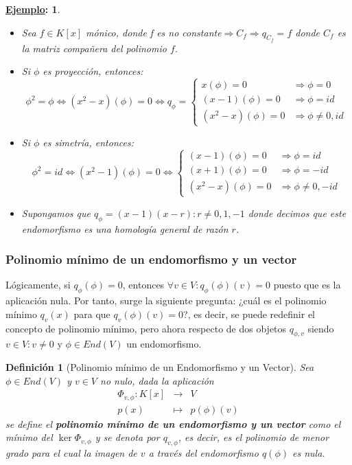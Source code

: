 \documentclass[10pt,a4paper,openright]{book}
\theoremstyle{break}
\newtheorem*{defi}{Definición}
\newtheorem*{ej}{\underline{Ejemplo}:}
\begin{document}
\begin{ej}
\begin{itemize}
\item Sea $f\in K[x]$ mónico, donde f es no constante$\Rightarrow C_f\Rightarrow q_{C_f}=f$ donde $C_f$ es la matriz compañera del polinomio $f$.

\item Si $\phi$ es proyección, entonces:
$$\phi^2= \phi\Leftrightarrow (x^2-x)(\phi)= 0\Leftrightarrow q_\phi = \begin{cases} x(\phi) = 0 & \Rightarrow \phi = 0 \\ (x-1)(\phi) = 0 & \Rightarrow\phi = id \\ (x^2-x)(\phi) = 0 & \Rightarrow\phi \neq 0,id\end{cases}$$

\item Si $\phi$ es simetría, entonces:
$$\phi^2=id\Leftrightarrow (x^2-1)(\phi)=0\Leftrightarrow \begin{cases} (x-1)(\phi) = 0 & \Rightarrow \phi = id \\ (x+1)(\phi) = 0 & \Rightarrow \phi = -id \\ (x^2-x)(\phi) = 0 & \Rightarrow\phi \neq 0,-id\end{cases}$$

\item Supongamos que $q_\phi = (x-1)(x-r): r\neq 0, 1, -1$ donde decimos que este endomorfismo es una homología general de razón $r$.
\end{itemize}
\end{ej}

\subsubsection{Polinomio mínimo de un endomorfismo y un vector}
Lógicamente, si $q_\phi(\phi) = 0 $, entonces $\forall v\in V : q_\phi(\phi)(v) = 0$ puesto que es la aplicación nula. Por tanto, surge la siguiente pregunta: ¿cuál es el polinomio mínimo $q_v(x)$ para que $q_v(\phi)(v) = 0$?, es decir, se puede redefinir el concepto de polinomio mínimo, pero ahora respecto de dos objetos $q_{\phi, v}$ siendo $v\in V: v\neq 0$ y $\phi\in End(V)$ un endomorfismo.

\begin{defi}[Polinomio mínimo de un Endomorfismo y un Vector]
Sea $\phi\in End(V)$ y $v\in V$ no nulo, dada la aplicación 
\begin{eqnarray*}
\Phi_{v, \phi}: K[x] &\longrightarrow& V \\ p(x) &\longmapsto& p(\phi)(v) 
\end{eqnarray*}
se define el \textbf{polinomio mínimo de un endomorfismo y un vector} como el mínimo del $\ker \Phi_{v,\phi}$ y se denota por $q_{v, \phi}$, es decir, es el polinomio de menor grado para el cual la imagen de $v$ a través del endomorfismo $q(\phi)$ es nula.
\end{defi}
\end{document}
